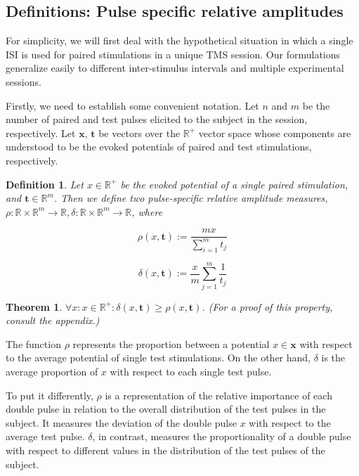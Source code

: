 \documentclass{article}
\newtheorem{definition}{Definition}
\newtheorem{theorem}{Theorem}
\begin{document}
\begin{multicols}{2}
\subsection{Definitions: Pulse specific relative amplitudes}

For simplicity, we will first deal with the hypothetical situation in which a
single ISI is used for paired stimulations in a unique TMS session. Our
formulations generalize easily to different inter-stimulus intervals and
multiple experimental sessions.

Firstly, we need to establish some convenient notation. Let $n$ and $m$ be the
number of paired and test pulses elicited to the subject in the session,
respectively. Let $\textbf{x}$, $\textbf{t}$ be vectors over the $\mathbb{R}^+$
vector space whose components are understood to be the evoked potentials of
paired and test stimulations, respectively.


\begin{definition} 

    Let $x \in \mathbb{R}^+$ be the evoked potential of a single paired
    stimulation, and $\textbf{t} \in \mathbb{R}^m$. Then we define two
    pulse-specific relative amplitude measures, $\rho : \mathbb{R} \times
    \mathbb{R}^m \to
    \mathbb{R}, \delta : \mathbb{R}\times \mathbb{R}^m \to \mathbb{R}$, where

    \begin{equation} 
        \rho(x, \textbf{t}) := \frac{mx}{\sum_{i=1}^mt_j}
    \end{equation}

    \begin{equation} 
        \delta(x, \textbf{t}) := \frac{x}{m}\sum_{j=1}^m\frac{1}{t_j} 
    \end{equation}
\end{definition}

\begin{theorem} 
    $\forall x: x \in \mathbb{R}^+:\delta(x, \textbf{t}) \geq \rho(x,
    \textbf{t})$. (For a proof of this property, consult the appendix.) 
\end{theorem}

The function $\rho$ represents the proportion between a potential $x \in
\textbf{x}$ with respect to the average
potential of single test stimulations. On the other hand, $\delta$ is the
average proportion of $x$ with respect to each single test pulse. 

To put it differently, $\rho$ is a representation of the relative importance of
each double pulse in relation to the overall distribution of the test pulses in
the subject. It measures the deviation of the double pulse $x$ with respect to
the average test pulse. $\delta$, in contrast, measures the proportionality of a
double pulse with respect to different values in the distribution of the test
pulses of the subject.


\end{multicols}
\end{document}
